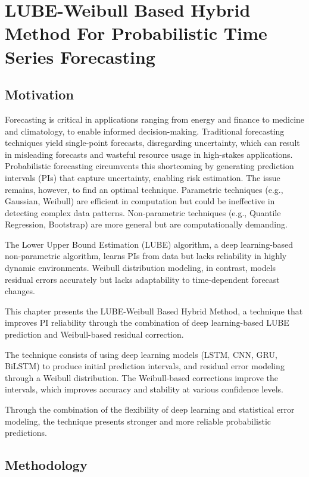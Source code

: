 \chapter{LUBE-Weibull Based Hybrid Method For Probabilistic Time Series Forecasting}\label{January Update}

\section{ Motivation}
Forecasting is critical in applications ranging from energy and finance to medicine and climatology, to enable informed decision-making. Traditional forecasting techniques yield single-point forecasts, disregarding uncertainty, which can result in misleading forecasts and 
wasteful resource usage in high-stakes applications. Probabilistic forecasting circumvents this shortcoming by generating prediction intervals (PIs) that capture uncertainty, enabling risk estimation. The issue remains, however, to find an optimal technique. Parametric techniques (e.g., Gaussian, Weibull) are efficient in computation but could be ineffective in detecting complex data patterns. Non-parametric techniques (e.g., Quantile Regression, Bootstrap) are more general but are computationally demanding.

The Lower Upper Bound Estimation (LUBE) algorithm, a deep learning-based non-parametric algorithm, learns PIs from data but lacks reliability in highly dynamic environments. 
Weibull distribution modeling, in contrast, models residual errors accurately but lacks adaptability to time-dependent forecast changes.

This chapter presents the LUBE-Weibull Based Hybrid Method, a technique that improves PI reliability through the combination of deep learning-based LUBE prediction and Weibull-based residual correction. 

The technique consists of using deep learning models (LSTM, CNN, GRU, BiLSTM) to produce initial prediction intervals, and residual error modeling through a Weibull distribution. 
The Weibull-based corrections improve the intervals, which improves accuracy and stability at various confidence levels. 

Through the combination of the flexibility of deep learning and statistical error modeling, the technique presents stronger and more reliable probabilistic predictions. 

\section{Methodology}
